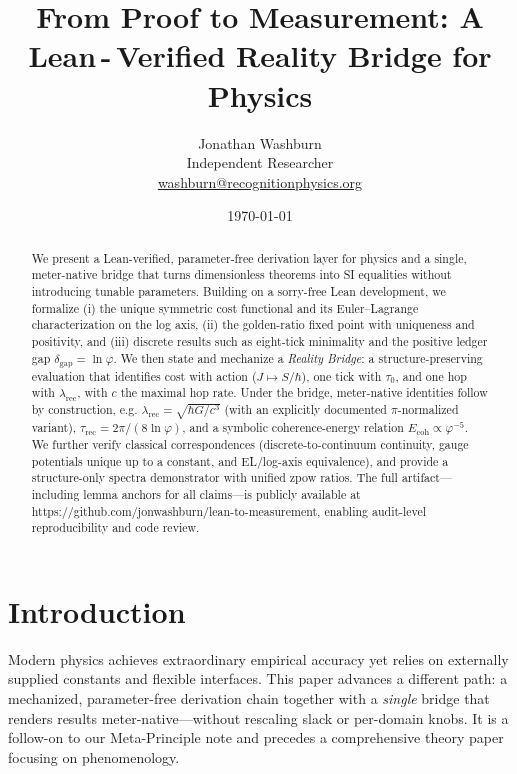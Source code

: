 \documentclass[11pt]{article}
\title{From Proof to Measurement: A Lean\,\mbox{-}\,Verified Reality Bridge for Physics}
\author{Jonathan Washburn\\Independent Researcher\\\href{mailto:washburn@recognitionphysics.org}{washburn@recognitionphysics.org}}
\date{\today}
\newcommand{\LeanRepoURL}{https://github.com/jonwashburn/lean-to-measurement}
\begin{document}
\maketitle

\begin{abstract}
We present a Lean-verified, parameter-free derivation layer for physics and a single, meter-native bridge that turns dimensionless theorems into SI equalities without introducing tunable parameters. Building on a sorry-free Lean development, we formalize (i) the unique symmetric cost functional and its Euler–Lagrange characterization on the log axis, (ii) the golden-ratio fixed point with uniqueness and positivity, and (iii) discrete results such as eight-tick minimality and the positive ledger gap $\delta_{\!\text{gap}}=\ln\varphi$. We then state and mechanize a \emph{Reality Bridge}: a structure-preserving evaluation that identifies cost with action ($J\mapsto S/\hbar$), one tick with $\tau_0$, and one hop with $\lambda_{\mathrm{rec}}$, with $c$ the maximal hop rate. Under the bridge, meter-native identities follow by construction, e.g. $\lambda_{\mathrm{rec}}=\sqrt{\hbar G/ c^{3}}$ (with an explicitly documented $\pi$-normalized variant), $\tau_{\mathrm{rec}}=2\pi/(8\ln\varphi)$, and a symbolic coherence-energy relation $E_{\mathrm{coh}}\propto\varphi^{-5}$. We further verify classical correspondences (discrete-to-continuum continuity, gauge potentials unique up to a constant, and EL/log-axis equivalence), and provide a structure-only spectra demonstrator with unified zpow ratios. The full artifact—including lemma anchors for all claims—is publicly available at \LeanRepoURL, enabling audit-level reproducibility and code review.
\end{abstract}

\section{Introduction}
Modern physics achieves extraordinary empirical accuracy yet relies on externally supplied constants and flexible interfaces. This paper advances a different path: a mechanized, parameter-free derivation chain together with a \emph{single} bridge that renders results meter-native—without rescaling slack or per-domain knobs. It is a follow-on to our Meta-Principle note and precedes a comprehensive theory paper focusing on phenomenology.
\end{document}
